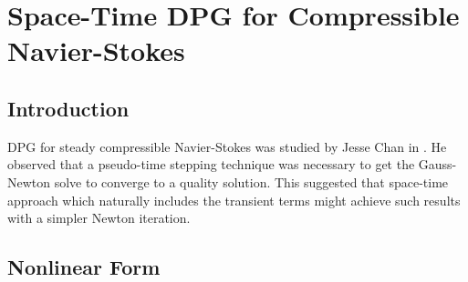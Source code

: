 \documentclass[Dissertation.tex]{subfiles}
\begin{document}
\graphicspath{{../Figures/}}
\chapter{Space-Time DPG for Compressible Navier-Stokes}
\label{sec:compressible}

\section{Introduction}
DPG for steady compressible Navier-Stokes was studied by Jesse Chan in \cite{JesseDissertation}.
He observed that a pseudo-time stepping technique was necessary to get the Gauss-Newton solve to converge 
to a quality solution.
This suggested that space-time approach which naturally includes the transient terms
might achieve such results with a simpler Newton iteration.

\section{Nonlinear Form}
\end{document}
